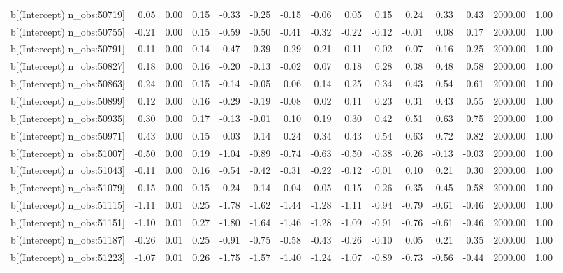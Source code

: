 \begin{table}[ht]
\begin{tabular}{rrrrrrrrrrrrrrr}
  b[(Intercept) n\_obs:50719] & 0.05 & 0.00 & 0.15 & -0.33 & -0.25 & -0.15 & -0.06 & 0.05 & 0.15 & 0.24 & 0.33 & 0.43 & 2000.00 & 1.00 \\ 
  b[(Intercept) n\_obs:50755] & -0.21 & 0.00 & 0.15 & -0.59 & -0.50 & -0.41 & -0.32 & -0.22 & -0.12 & -0.01 & 0.08 & 0.17 & 2000.00 & 1.00 \\ 
  b[(Intercept) n\_obs:50791] & -0.11 & 0.00 & 0.14 & -0.47 & -0.39 & -0.29 & -0.21 & -0.11 & -0.02 & 0.07 & 0.16 & 0.25 & 2000.00 & 1.00 \\ 
  b[(Intercept) n\_obs:50827] & 0.18 & 0.00 & 0.16 & -0.20 & -0.13 & -0.02 & 0.07 & 0.18 & 0.28 & 0.38 & 0.48 & 0.58 & 2000.00 & 1.00 \\ 
  b[(Intercept) n\_obs:50863] & 0.24 & 0.00 & 0.15 & -0.14 & -0.05 & 0.06 & 0.14 & 0.25 & 0.34 & 0.43 & 0.54 & 0.61 & 2000.00 & 1.00 \\ 
  b[(Intercept) n\_obs:50899] & 0.12 & 0.00 & 0.16 & -0.29 & -0.19 & -0.08 & 0.02 & 0.11 & 0.23 & 0.31 & 0.43 & 0.55 & 2000.00 & 1.00 \\ 
  b[(Intercept) n\_obs:50935] & 0.30 & 0.00 & 0.17 & -0.13 & -0.01 & 0.10 & 0.19 & 0.30 & 0.42 & 0.51 & 0.63 & 0.75 & 2000.00 & 1.00 \\ 
  b[(Intercept) n\_obs:50971] & 0.43 & 0.00 & 0.15 & 0.03 & 0.14 & 0.24 & 0.34 & 0.43 & 0.54 & 0.63 & 0.72 & 0.82 & 2000.00 & 1.00 \\ 
  b[(Intercept) n\_obs:51007] & -0.50 & 0.00 & 0.19 & -1.04 & -0.89 & -0.74 & -0.63 & -0.50 & -0.38 & -0.26 & -0.13 & -0.03 & 2000.00 & 1.00 \\ 
  b[(Intercept) n\_obs:51043] & -0.11 & 0.00 & 0.16 & -0.54 & -0.42 & -0.31 & -0.22 & -0.12 & -0.01 & 0.10 & 0.21 & 0.30 & 2000.00 & 1.00 \\ 
  b[(Intercept) n\_obs:51079] & 0.15 & 0.00 & 0.15 & -0.24 & -0.14 & -0.04 & 0.05 & 0.15 & 0.26 & 0.35 & 0.45 & 0.58 & 2000.00 & 1.00 \\ 
  b[(Intercept) n\_obs:51115] & -1.11 & 0.01 & 0.25 & -1.78 & -1.62 & -1.44 & -1.28 & -1.11 & -0.94 & -0.79 & -0.61 & -0.46 & 2000.00 & 1.00 \\ 
  b[(Intercept) n\_obs:51151] & -1.10 & 0.01 & 0.27 & -1.80 & -1.64 & -1.46 & -1.28 & -1.09 & -0.91 & -0.76 & -0.61 & -0.46 & 2000.00 & 1.00 \\ 
  b[(Intercept) n\_obs:51187] & -0.26 & 0.01 & 0.25 & -0.91 & -0.75 & -0.58 & -0.43 & -0.26 & -0.10 & 0.05 & 0.21 & 0.35 & 2000.00 & 1.00 \\ 
  b[(Intercept) n\_obs:51223] & -1.07 & 0.01 & 0.26 & -1.75 & -1.57 & -1.40 & -1.24 & -1.07 & -0.89 & -0.73 & -0.56 & -0.44 & 2000.00 & 1.00 \\ 

\end{tabular}
\end{table}
